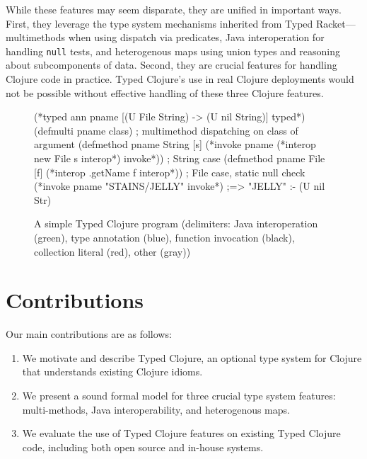 While these features may seem disparate, they are unified in important
ways. First, they leverage the type system mechanisms
inherited from Typed Racket---multimethods when using 
dispatch via predicates, Java interoperation for handling
\texttt{null} tests, and heterogenous maps using union types and
reasoning about subcomponents of data. Second,
they are crucial features for handling Clojure code in
practice. Typed Clojure's use in real Clojure deployments would not be
possible without effective handling of these three Clojure features. 

\begin{figure*}[t!]
\begin{cljlisting}
(*typed ann pname [(U File String) -> (U nil String)] typed*)
(defmulti pname class)  ; multimethod dispatching on class of argument
(defmethod pname String [s] (*invoke pname (*interop new File s interop*) invoke*)) ; String case 
(defmethod pname File [f] (*interop .getName f interop*)) ; File case, static null check
(*invoke pname "STAINS/JELLY" invoke*) ;=> "JELLY" :- (U nil Str)
\end{cljlisting}
\caption{A simple Typed Clojure program (delimiters: {\color{interop}Java interoperation (green)}, 
  {\color{types}type annotation (blue)},
  {\color{invoke}function invocation (black)}, {\color{red}collection literal (red)}, {\color{mygray}other (gray)})}
\label{fig:ex1}
\end{figure*}


\section{Contributions}

Our main contributions are as follows:

\begin{enumerate}
  \item We motivate and describe  Typed Clojure, an optional
    type system for Clojure that understands existing Clojure idioms.
  \item We present a sound formal model for three crucial type
    system features: multi-methods, Java
    interoperability, and heterogenous maps.
  \item We evaluate the use of Typed Clojure features on existing
    Typed Clojure code, including both open source and in-house systems.
\end{enumerate}

